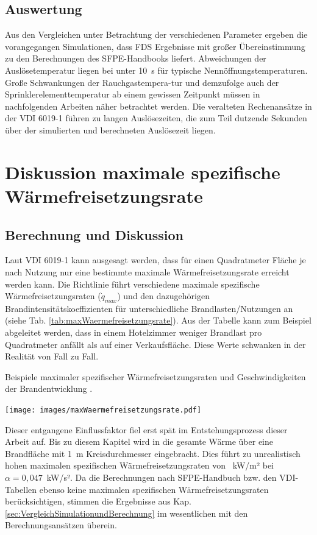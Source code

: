 \subsection{Auswertung}

Aus den Vergleichen unter Betrachtung der verschiedenen Parameter ergeben die vorangegangen Simulationen, dass FDS Ergebnisse mit großer Übereinstimmung zu den Berechnungen des SFPE-Handbooks liefert. Abweichungen der Auslösetemperatur liegen bei unter 10~s für typische Nennöffnungstemperaturen. Große Schwankungen der Rauch\-gas\-tem\-pe\-ra-tur und demzufolge auch der Sprinklerelementtemperatur ab einem gewissen Zeitpunkt müssen in nachfolgenden Arbeiten näher betrachtet werden. Die veralteten Rechenansätze in der VDI 6019-1 führen zu langen Auslösezeiten, die zum Teil dutzende Sekunden über der simulierten und berechneten Auslösezeit liegen.
\clearpage


\section{Diskussion maximale spezifische Wärmefreisetzungsrate}
\label{sec:maxWaermefreisetzungsrate}
\subsection{Berechnung und Diskussion}

Laut VDI 6019-1 kann ausgesagt werden, dass für einen Quadratmeter Fläche je nach Nutzung nur eine bestimmte maximale Wärmefreisetzungsrate erreicht werden kann. Die Richtlinie führt verschiedene maximale spezifische Wärmefreisetzungsraten ($\Dot{q}_{max}$) und den dazugehörigen Brandintensitätskoeffizienten für unterschiedliche Brandlasten/Nutzungen an (siehe Tab. \ref{tab:maxWaermefreisetzungsrate}). Aus der Tabelle kann zum Beispiel abgeleitet werden, dass in einem Hotelzimmer weniger Brandlast pro Quadratmeter anfällt als auf einer Verkaufsfläche. Diese Werte schwanken in der Realität von Fall zu Fall.  
\begin{table}[b]
    \caption{Beispiele maximaler spezifischer Wärmefreisetzungsraten und Geschwindigkeiten der Brandentwicklung \cite{VDI6019B1}.}
    \centering
    \texttt{[image: images/maxWaermefreisetzungsrate.pdf]}
    \label{tab:maxWaermefreisetzungsrate}
\end{table}
Dieser entgangene Einflussfaktor fiel erst spät im Entstehungsprozess dieser Arbeit auf. Bis zu diesem Kapitel wird in die gesamte Wärme über eine Brandfläche mit 1~m Kreisdurchmesser eingebracht. Dies führt zu unrealistisch hohen maximalen spezifischen Wärmefreisetzungsraten von ~kW/m² bei $\alpha=0{,}047$~kW/s². 
Da die Berechnungen nach SFPE-Handbuch bzw. den VDI-Tabellen ebenso keine maximalen spezifischen Wärmefreisetzungsraten berücksichtigen, stimmen die Ergebnisse aus Kap. \ref{sec:VergleichSimulationundBerechnung} im wesentlichen mit den Berechnungsansätzen überein. 

